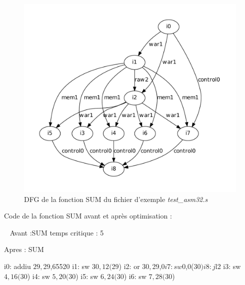 \documentclass[a4paper, 11pt, notitlepage]{article}
\begin{document}
\begin{figure}[!h]
  \centering
  \includegraphics[scale=0.80]{sum_dfg.pdf}
  \caption{DFG de la fonction SUM du fichier d'exemple \emph{test\_asm32.s}}
\end{figure}


\newpage
Code de la fonction SUM avant et après optimisation :

\
\newline
Avant :SUM
temps critique : 5


Apres : SUM

\begin{mips}
i0: addiu $29,$29,65520
i1: sw $30,12($29)
i2: or $30,$29,$0
i7: sw $0,0($30)
i8: j $l2
i3: sw $4,16($30)
i4: sw $5,20($30)
i5: sw $6,24($30)
i6: sw $7,28($30)
\end{mips}
\end{document}
